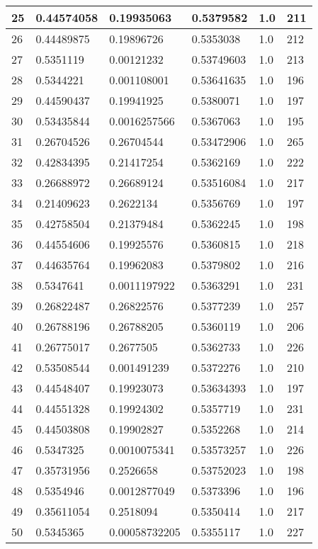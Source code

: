 \begin{longtable}{|l|l|l|l|l|l|}
25 & 0.44574058 & 0.19935063 & 0.5379582 & 1.0 & 211 \\ \hline 
26 & 0.44489875 & 0.19896726 & 0.5353038 & 1.0 & 212 \\ \hline 
27 & 0.5351119 & 0.00121232 & 0.53749603 & 1.0 & 213 \\ \hline 
28 & 0.5344221 & 0.001108001 & 0.53641635 & 1.0 & 196 \\ \hline 
29 & 0.44590437 & 0.19941925 & 0.5380071 & 1.0 & 197 \\ \hline 
30 & 0.53435844 & 0.0016257566 & 0.5367063 & 1.0 & 195 \\ \hline 
31 & 0.26704526 & 0.26704544 & 0.53472906 & 1.0 & 265 \\ \hline 
32 & 0.42834395 & 0.21417254 & 0.5362169 & 1.0 & 222 \\ \hline 
33 & 0.26688972 & 0.26689124 & 0.53516084 & 1.0 & 217 \\ \hline 
34 & 0.21409623 & 0.2622134 & 0.5356769 & 1.0 & 197 \\ \hline 
35 & 0.42758504 & 0.21379484 & 0.5362245 & 1.0 & 198 \\ \hline 
36 & 0.44554606 & 0.19925576 & 0.5360815 & 1.0 & 218 \\ \hline 
37 & 0.44635764 & 0.19962083 & 0.5379802 & 1.0 & 216 \\ \hline 
38 & 0.5347641 & 0.0011197922 & 0.5363291 & 1.0 & 231 \\ \hline 
39 & 0.26822487 & 0.26822576 & 0.5377239 & 1.0 & 257 \\ \hline 
40 & 0.26788196 & 0.26788205 & 0.5360119 & 1.0 & 206 \\ \hline 
41 & 0.26775017 & 0.2677505 & 0.5362733 & 1.0 & 226 \\ \hline 
42 & 0.53508544 & 0.001491239 & 0.5372276 & 1.0 & 210 \\ \hline 
43 & 0.44548407 & 0.19923073 & 0.53634393 & 1.0 & 197 \\ \hline 
44 & 0.44551328 & 0.19924302 & 0.5357719 & 1.0 & 231 \\ \hline 
45 & 0.44503808 & 0.19902827 & 0.5352268 & 1.0 & 214 \\ \hline 
46 & 0.5347325 & 0.0010075341 & 0.53573257 & 1.0 & 226 \\ \hline 
47 & 0.35731956 & 0.2526658 & 0.53752023 & 1.0 & 198 \\ \hline 
48 & 0.5354946 & 0.0012877049 & 0.5373396 & 1.0 & 196 \\ \hline 
49 & 0.35611054 & 0.2518094 & 0.5350414 & 1.0 & 217 \\ \hline 
50 & 0.5345365 & 0.00058732205 & 0.5355117 & 1.0 & 227 \\ \hline 
\end{longtable}